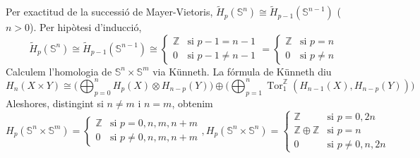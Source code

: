 \documentclass[compress,10pt]{article}
\theoremstyle{definition}
\DeclareMathOperator{\Tor}{Tor}
\begin{document}
\begin{center}
\end{center} 
Per exactitud de la successió de Mayer-Vietoris, $\widetilde{H}_{p}(\mathbb{S}^{n})\cong\widetilde{H}_{p-1}(\mathbb{S}^{n-1})$ ($n>0$). Per hipòtesi d'inducció,
\begin{equation*}
    \widetilde{H}_{p}(\mathbb{S}^{n})
    \cong\widetilde{H}_{p-1}(\mathbb{S}^{n-1})
    \cong\begin{cases}
        \mathbb{Z}&\textrm{si $p-1=n-1$}\\
        0&\textrm{si $p-1\neq n-1$}
    \end{cases}
    =\begin{cases}
        \mathbb{Z}&\textrm{si $p=n$}\\
        0&\textrm{si $p\neq n$}
    \end{cases}
\end{equation*}
Calculem l'homologia de $\mathbb{S}^{n}\times\mathbb{S}^{m}$ via Künneth. La fórmula de Künneth diu
\begin{equation*}
    H_{n}(X\times Y)
    \cong\Big(\bigoplus_{p=0}^{n}H_{p}(X)\otimes H_{n-p}(Y)\Big)\oplus\Big(\bigoplus_{p=1}^{n}\Tor_{1}^{\mathbb{Z}}(H_{n-1}(X),H_{n-p}(Y))\Big)
\end{equation*}
Aleshores, distingint si $n\neq m$ i $n=m$, obtenim
\begin{equation*}
H_{p}(\mathbb{S}^{n}\times\mathbb{S}^{m})=\begin{cases}
    \mathbb{Z}&\textrm{si $p=0,n,m,n+m$}\\
    0&\text{si $p\neq0,n,m,n+m$}
    \end{cases},
    H_{p}(\mathbb{S}^{n}\times\mathbb{S}^{n})=\begin{cases}
    \mathbb{Z}&\textrm{si $p=0,2n$}\\
    \mathbb{Z}\oplus\mathbb{Z}&\textrm{si $p=n$}\\
    0&\text{si $p\neq0,n,2n$}
    \end{cases}
\end{equation*}
\end{document}
